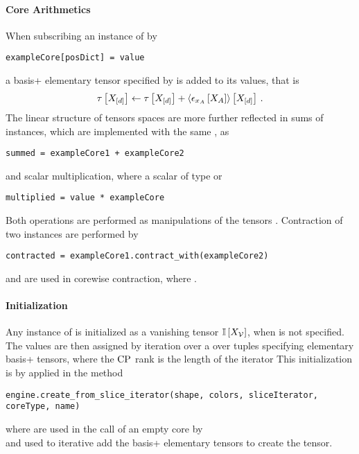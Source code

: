 \paragraph{Core Arithmetics}
When subscribing an instance  of  by
\begin{lstlisting}
exampleCore[posDict] = value
\end{lstlisting}
a basis+ elementary tensor specified by  is added to its values, that is
\begin{align*}
    \tau\left[X_{[d]}\right] \leftarrow \tau\left[X_{[d]}\right] + \left\langle \epsilon_{x_{A}}\left[X_{A}\right]\right\rangle \left[ X_{[d]} \right] \, .
\end{align*}
The linear structure of tensors spaces are more further reflected in sums of  instances, which are implemented with the same , as
\begin{lstlisting}
summed = exampleCore1 + exampleCore2
\end{lstlisting}
and scalar multiplication, where a scalar  of type  or 
\begin{lstlisting}
multiplied = value * exampleCore
\end{lstlisting}
Both operations are performed as manipulations of the tensors .
Contraction of two  instances are performed by
\begin{lstlisting}
contracted = exampleCore1.contract_with(exampleCore2)
\end{lstlisting}
and are used in corewise contraction, where .

\paragraph{Initialization}
Any instance of  is initialized as a vanishing tensor $\mathbb{I}\left[X_{\mathcal{V}}\right]$, when  is not specified.
The values are then assigned by iteration over a  over  tuples specifying elementary basis+ tensors, where the $\mathrm{CP}$ rank is the length of the iterator
This initialization is by applied in the method
\begin{lstlisting}
engine.create_from_slice_iterator(shape, colors, sliceIterator, coreType, name)
\end{lstlisting}
where  are used in the call of an empty core by \\
 and  used to iterative add the basis+ elementary tensors to create the tensor.

